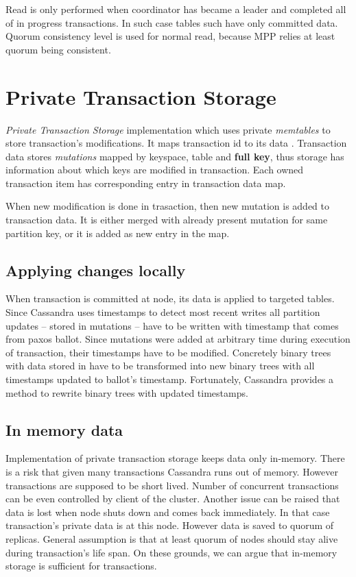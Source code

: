 Read is only performed when coordinator has became a leader and completed all of in progress transactions. In such case tables such have only committed data. Quorum consistency level is used for normal read, because MPP relies at least quorum being consistent.




\section{Private Transaction Storage}
\emph{Private Transaction Storage} implementation which uses private \emph{memtables} to store transaction's modifications. It maps transaction id to its data . Transaction data stores \emph{mutations} mapped by keyspace, table and \textbf{full key}, thus storage has information about which keys are modified in transaction. Each owned transaction item has corresponding entry in transaction data map.

When new modification is done in trasaction, then new mutation is added to transaction data. It is either merged with already present mutation for same partition key, or it is added as new entry in the map.


\subsection{Applying changes locally}
When transaction is committed at node, its data is applied to targeted tables.
Since Cassandra uses timestamps to detect most recent writes all partition updates -- stored in mutations -- have to be written with timestamp that comes from paxos ballot. Since mutations were added at arbitrary time during execution of transaction, their timestamps have to be modified. Concretely binary trees with data stored in  have to be transformed into new binary trees with all timestamps updated to ballot's timestamp. Fortunately, Cassandra provides a method to rewrite binary trees with updated timestamps.


\subsection{In memory data}
Implementation of private transaction storage keeps data only in-memory. There is a risk that given many transactions Cassandra runs out of memory. However transactions are supposed to be short lived. Number of concurrent transactions can be even controlled by client of the cluster. 
Another issue can be raised that data is lost when node shuts down and comes back immediately. In that case transaction’s private data is at this node. However data is saved to quorum of replicas. General assumption is that at least quorum of nodes should stay alive during transaction’s life span. On these grounds, we can argue that in-memory storage is sufficient for transactions.



